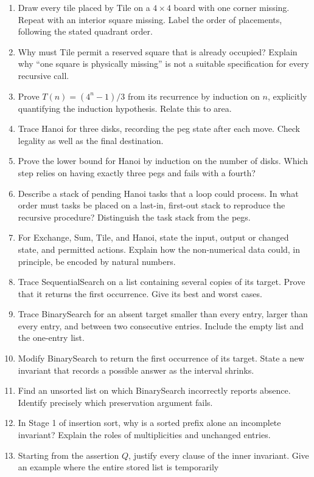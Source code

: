 \begin{enumerate}
\item Draw every tile placed by Tile on a $4\times4$ board with one
corner missing. Repeat with an interior square missing. Label the order
of placements, following the stated quadrant order.
\item Why must Tile permit a reserved square that is already occupied?
Explain why ``one square is physically missing'' is not a suitable
specification for every recursive call.
\item Prove $T(n)=(4^n-1)/3$ from its recurrence by induction on $n$,
explicitly quantifying the induction hypothesis. Relate this to area.
\item Trace Hanoi for three disks, recording the peg state after each
move. Check legality as well as the final destination.
\item Prove the lower bound for Hanoi by induction on the number of disks.
Which step relies on having exactly three pegs and fails with a fourth?
\item Describe a stack of pending Hanoi tasks that a loop could process.
In what order must tasks be placed on a last-in, first-out stack to reproduce
the recursive procedure? Distinguish the task stack from the pegs.
\item For Exchange, Sum, Tile, and Hanoi, state the input, output or changed
state, and permitted actions. Explain how the non-numerical data could,
in principle, be encoded by natural numbers.
\item Trace SequentialSearch on a list containing several copies of its target.
Prove that it returns the first occurrence. Give its best and worst cases.
\item Trace BinarySearch for an absent target smaller than every entry,
larger than every entry, and between two consecutive entries. Include the
empty list and the one-entry list.
\item Modify BinarySearch to return the first occurrence of its target.
State a new invariant that records a possible answer as the interval shrinks.
\item Find an unsorted list on which BinarySearch incorrectly reports
absence. Identify precisely which preservation argument fails.
\item In Stage 1 of insertion sort, why is a sorted prefix alone an
incomplete invariant? Explain the roles of multiplicities and unchanged entries.
\item Starting from the assertion $Q$, justify every clause of the inner
invariant. Give an example where the entire stored list is temporarily

\end{enumerate}
